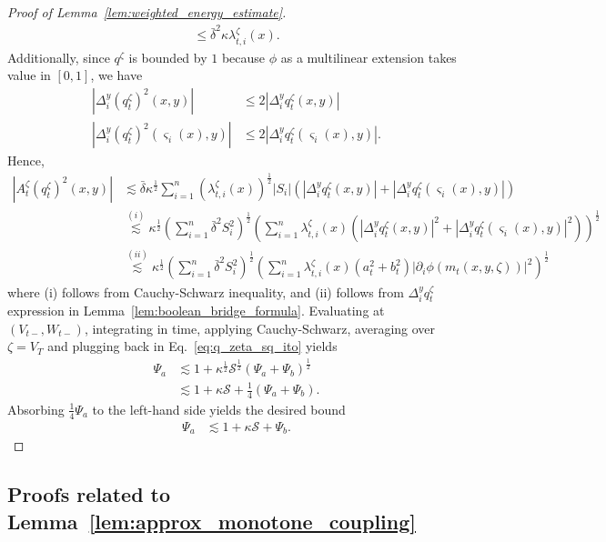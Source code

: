 \documentclass[11pt]{article}
\newcommand{\flip}{\varsigma}
\newcommand{\cS}{\mathcal{S}}
\newcommand{\btau}{\kappa}
\newcommand{\bdelta}{\bar{\delta}}
\newcommand{\uV}{V}
\newcommand{\uW}{W}
\theoremstyle{named}
\theoremstyle{plain}
\newcommand{\parenth}[1]{\left( #1 \right)}
\newcommand{\abss}[1]{\left| #1 \right |}
\begin{document}
\begin{proof}[Proof of Lemma~\ref{lem:weighted_energy_estimate}]
\begin{align*}
    \leq \bdelta^2 \btau  \lambda_{t, i}^{\zeta}(x).
  \end{align*}
  Additionally, since $q^{\zeta}$ is bounded by $1$ because $\phi$ as a multilinear extension takes value in $[0, 1]$, we have
  \begin{align*}
    \abss{\Delta_i^y (q_{t}^{\zeta})^2 (x, y)} &\leq 2 \abss{\Delta_i^y q_{t}^{\zeta} (x, y)} \\
    \abss{\Delta_i^y (q_{t}^{\zeta})^2 (\flip_i(x), y)} &\leq 2 \abss{\Delta_i^y q_{t}^{\zeta} (\flip_i(x), y)}.
  \end{align*}
  Hence,
  \begin{align*}
    \abss{A_t^{\zeta} (q_{t}^{\zeta})^2 (x, y)} &\lesssim \bdelta \btau^{\frac12} \sum_{i=1}^n \parenth{\lambda_{t, i}^{\zeta}(x)}^{\frac12} \abss{S_i} \parenth{\abss{\Delta_i^y q_{t}^{\zeta} (x, y)} + \abss{\Delta_i^y q_{t}^{\zeta} (\flip_i(x), y)}} \\
    &\overset{(i)}{\lesssim} \btau^{\frac12} \parenth{\sum_{i=1}^n \bdelta^2 S_i^2}^{\frac12} \parenth{\sum_{i=1}^n \lambda_{t, i}^{\zeta}(x) \parenth{\abss{\Delta_i^y q_{t}^{\zeta} (x, y)}^2 + \abss{\Delta_i^y q_{t}^{\zeta} (\flip_i(x), y)}^2}}^{\frac12} \\
    &\overset{(ii)}{\lesssim} \btau^{\frac12} \parenth{\sum_{i=1}^n \bdelta^2 S_i^2}^{\frac12} \parenth{\sum_{i=1}^n \lambda_{t, i}^{\zeta}(x) \parenth{a_t^2 + b_t^2}\abss{\partial_i \phi(m_t(x, y, \zeta))}^2 }^{\frac12}
  \end{align*}
  where (i) follows from Cauchy-Schwarz inequality, and (ii) follows from $\Delta_i^y q_{t}^{\zeta}$ expression in Lemma~\ref{lem:boolean_bridge_formula}. 
  Evaluating at $(\uV_{t-}, \uW_{t-})$, integrating in time, applying Cauchy-Schwarz, averaging over $\zeta = \uV_T$ and plugging back in Eq.~\eqref{eq:q_zeta_sq_ito} yields
  \begin{align*}
    \Psi_a &\lesssim 1 + \btau^{\frac12} \cS^{\frac12} \parenth{\Psi_a + \Psi_b}^{\frac12} \\
    &\lesssim 1 + \btau \cS + \frac14 (\Psi_a + \Psi_b).
  \end{align*}
  Absorbing $\frac14 \Psi_a$ to the left-hand side yields the desired bound
  \begin{align*}
    \Psi_a &\lesssim 1 + \btau \cS + \Psi_b.
  \end{align*}
\end{proof}



\subsection{Proofs related to Lemma~\ref{lem:approx_monotone_coupling}}
\label{sub:proof_related_to_monotone_coupling}
\end{document}

